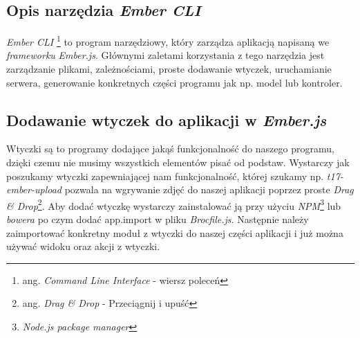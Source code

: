 \documentclass[openright]{xmgr}
\begin{document}
\subsection{Opis narzędzia \textit{Ember CLI}}
\textit{Ember CLI} \footnote{ang. \textit{Command Line Interface} - wiersz poleceń} to program narzędziowy, który zarządza aplikacją napisaną we \textit{frameworku} \textit{Ember.js}. Głównymi zaletami korzystania z tego narzędzia jest zarządzanie plikami, zależnościami, proste dodawanie wtyczek, uruchamianie serwera, generowanie konkretnych części programu jak np. model lub kontroler.

\subsection{Dodawanie wtyczek do aplikacji w \textit{Ember.js}}
Wtyczki są to programy dodające jakąś funkcjonalność do naszego programu, dzięki czemu nie musimy wszystkich elementów pisać od podstaw. Wystarczy jak poszukamy wtyczki zapewniającej nam funkcjonalność, której szukamy np. \textit{t17-ember-upload} pozwala na wgrywanie zdjęć do naszej aplikacji poprzez proste \textit{Drag \& Drop}\footnote{ang. \textit{Drag \& Drop} -  Przeciągnij i upuść}. Aby dodać wtyczkę wystarczy zainstalować ją przy użyciu \textit{NPM}\footnote{\textit{Node.js package manager}} lub \textit{bowera}  po czym dodać app.import w pliku \textit{Brocfile.js}. Następnie należy zaimportować konkretny moduł z wtyczki do naszej części aplikacji i już można używać widoku oraz akcji z wtyczki.
\end{document}
